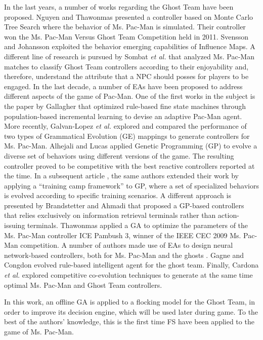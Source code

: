 \documentclass[a4paper]{llncs}
\begin{document}
In the last years, a number of works regarding the Ghost Team have been proposed. Nguyen and Thawonmas \cite{Nguyen2011,Nguyen2013} presented a controller based on Monte Carlo Tree Search where the behavior of Ms. Pac-Man is simulated. Their controller won the Ms. Pac-Man Versus Ghost Team Competition held in 2011. Svensson and Johansson \cite{Svensson2012} exploited the behavior emerging capabilities of Influence Maps. A different line of research is pursued by Sombat \textit{et al.} \cite{Sombat2012} that analyzed Ms. Pac-Man matches to classify Ghost Team controllers according to their enjoyability and, therefore, understand the attribute that a NPC should posses for players to be engaged. 
In the last decade, a number of EAs have been proposed to address different aspects of the game of Pac-Man. One of the first works in the subject is the paper by Gallagher \cite{Gallagher03} that optimized rule-based fine state machines through population-based incremental learning to devise an adaptive Pac-Man agent. More recently, Galvan-Lopez \textit{et al.} \cite{Galvan-Lopez10} explored and compared the performance of two types of Grammatical Evolution (GE) mappings to generate controllers for Ms. Pac-Man. Alhejali and Lucas \cite{Alhejali10} applied Genetic Programming (GP) to evolve a diverse set of behaviors using different versions of the game. The resulting controller proved to be competitive with the best reactive controllers reported at the time. In a subsequent article \cite{AlhejaliLucas11}, the same authors extended their work by applying a ``training camp framework'' to GP, where a set of specialized behaviors is evolved according to specific training scenarios. A different approach is presented by Brandstetter and Ahmadi \cite{Brandstetter12} that proposed a GP-based controllers that relies exclusively on information retrieval terminals rather than action-issuing terminals.  Thawonmas \cite{Thawonmas10} applied a GA to optimize the parameters of the Ms. Pac-Man controller ICE Pambush 3, winner of the IEEE CEC 2009 Ms. Pac-Man competition. A number of authors made use of EAs to design neural network-based controllers, both for Ms. Pac-Man \cite{Lucas05,Burrow09} and the ghosts \cite{Jia-Yue11}. Gagne and Congdon \cite{Gagne2012} evolved rule-based intelligent agent for the ghost team. Finally, Cardona \textit{et al.} \cite{Cardona13} explored competitive co-evolution techniques to generate at the same time optimal Ms. Pac-Man and Ghost Team controllers.

In this work, an offline GA is applied to a flocking model for the Ghost Team, in order to improve its decision engine, which will be used later during game. To the best of the authors' knowledge, this is the first time FS have been applied to the game of Ms. Pac-Man.
\end{document}
